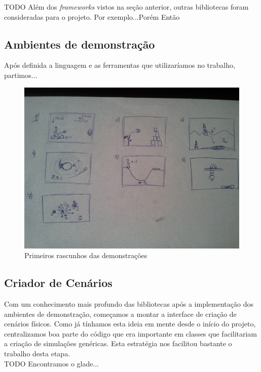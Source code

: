 TODO
Além dos \textit{frameworks} vistos na seção anterior, outras bibliotecas foram consideradas para o projeto. Por exemplo...Porém Então

\subsection{Ambientes de demonstração}
Após definida a linguagem e as ferramentas que utilizaríamos no trabalho, partimos...

\begin{figure}[H]
	\centering
	\includegraphics[scale=0.2]{images/tcc-demos.jpg}
	\caption{Primeiros rascunhos das demonstrações}
\end{figure}

\subsection{Criador de Cenários}
Com um conhecimento mais profundo das bibliotecas após a implementação dos ambientes de demonstração, começamos a montar a interface de criação de cenários físicos. Como já tínhamos esta ideia em mente desde o início do projeto, centralizamos boa parte do código que era importante em classes que facilitariam a criação de simulações genéricas. Esta estratégia nos facilitou bastante o trabalho desta etapa.\\

TODO
Encontramos o glade...

